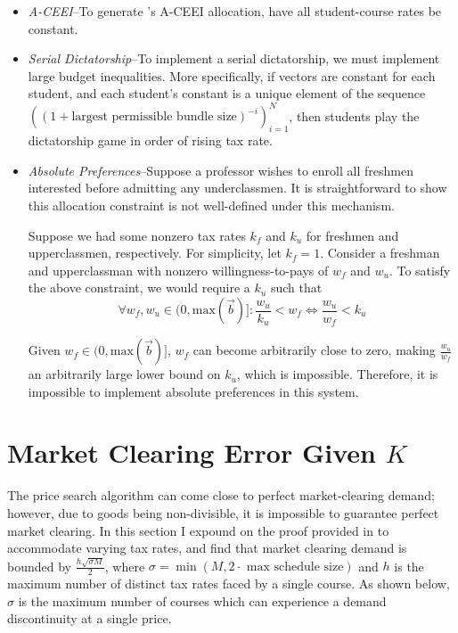 \documentclass{article}
\begin{document}
\begin{itemize}
    \item \emph{A-CEEI}--To generate \textcite{budish2011}'s A-CEEI allocation, have all student-course rates be constant.
    
    \item \emph{Serial Dictatorship}--To implement a serial dictatorship, we must implement large budget inequalities. More specifically, if vectors are constant for each student, and each student's constant is a unique element of the sequence $\left((1 + \mbox{largest permissible bundle size})^{-i}\right)_{i = 1}^N$, then students play the dictatorship game in order of rising tax rate.

    \item \emph{Absolute Preferences}--Suppose a professor wishes to enroll all freshmen interested before admitting any underclassmen. It is straightforward to show this allocation constraint is not well-defined under this mechanism.
    
    Suppose we had some nonzero tax rates $k_f$ and $k_u$ for freshmen and upperclassmen, respectively. For simplicity, let $k_f = 1$. Consider a freshman and upperclassman with nonzero willingness-to-pays of $w_f$ and $w_u$. To satisfy the above constraint, we would require a $k_u$ such that $$\forall w_f, w_u \in (0, \mbox{max}(\vec{b})]: \frac{w_u}{k_u} < w_f \iff \frac{w_u}{w_f} < k_u$$
    
    Given $w_f \in (0, \mbox{max}(\vec{b})]$, $w_f$ can become arbitrarily close to zero, making $\frac{w_u}{w_f}$ an arbitrarily large lower bound on $k_u$, which is impossible. Therefore, it is impossible to implement absolute preferences in this system.
\end{itemize}





\section{Market Clearing Error Given $K$}

The \textcite{othman2010} price search algorithm can come close to perfect market-clearing demand; however, due to goods being non-divisible, it is impossible to guarantee perfect market clearing. In this section I expound on the proof provided in \textcite{budish2011} to accommodate varying tax rates, and find that market clearing demand is bounded by $\frac{h\sqrt{\sigma M}}{2}$, where $\sigma = \min(M, 2 \cdot \mbox{ max schedule size})$ and $h$ is the maximum number of distinct tax rates faced by a single course. As shown below, $\sigma$ is the maximum number of courses which can experience a demand discontinuity at a single price. 
\end{document}
